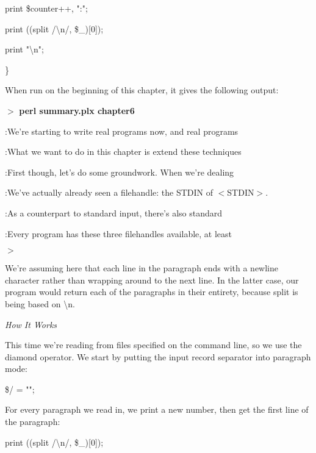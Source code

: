 \documentclass[a4paper,11pt]{book}
\begin{document}
\noindent print \$counter++, ":";

\noindent print ((split /\textbackslash n/, \$\_)[0]);

\noindent print "\textbackslash n";

\noindent \}

\noindent 

\noindent When run on the beginning of this chapter, it gives the following output:

\noindent 

\noindent $>$ \textbf{perl summary.plx chapter6}

:We're starting to write real programs now, and real programs

:What we want to do in this chapter is extend these techniques

:First though, let's do some groundwork. When we're dealing

:We've actually already seen a filehandle: the STDIN of $<$STDIN$>$.

:As a counterpart to standard input, there's also standard

:Every program has these three filehandles available, at least

\noindent $>$

\noindent 

\noindent We're assuming here that each line in the paragraph ends with a newline character rather than wrapping around to the next line. In the latter case, our program would return each of the paragraphs in their entirety, because split is being based on \textbackslash n.

\noindent 

\noindent \textit{How It Works}

\noindent This time we're reading from files specified on the command line, so we use the diamond operator. We start by putting the input record separator into paragraph mode:

\noindent 

\noindent 

\noindent \$/ = "";

\noindent 

\noindent For every paragraph we read in, we print a new number, then get the first line of the paragraph:

\noindent 

\noindent print ((split /\textbackslash n/, \$\_)[0]);

\noindent 
\end{document}
